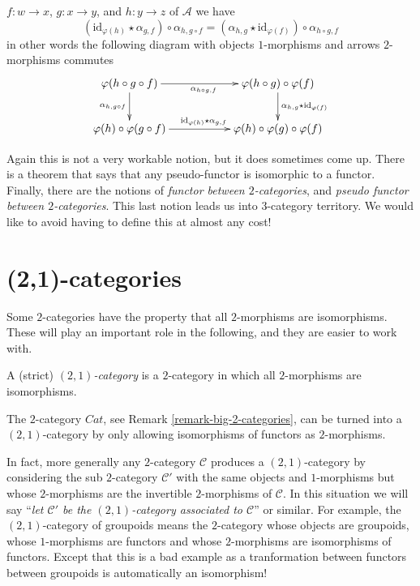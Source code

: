 \begin{definition}
\begin{enumerate}
\begin{enumerate}
$f : w \to x$, $g : x \to y$, and $h : y \to z$ of $\mathcal{A}$
we have
$$
(\text{id}_{\varphi(h)} \star \alpha_{g, f})
\circ
\alpha_{h, g \circ f}
=
(\alpha_{h, g} \star \text{id}_{\varphi(f)})
\circ
\alpha_{h \circ g, f}
$$
in other words the following diagram with objects
$1$-morphisms and arrows $2$-morphisms commutes
$$
\xymatrix{
\varphi(h \circ g \circ f)
\ar[d]_{\alpha_{h, g \circ f}}
\ar[rr]_{\alpha_{h \circ g, f}}
& &
\varphi(h \circ g) \circ \varphi(f)
\ar[d]^{\alpha_{h, g} \star \text{id}_{\varphi(f)}} \\
\varphi(h) \circ \varphi(g \circ f)
\ar[rr]^{\text{id}_{\varphi(h)} \star \alpha_{g, f}}
& &
\varphi(h) \circ \varphi(g) \circ \varphi(f)
}
$$
\end{enumerate}
\end{enumerate}
\end{definition}

\noindent
Again this is not a very workable notion, but it does sometimes come up.
There is a theorem that says that any pseudo-functor is isomorphic to
a functor. Finally, there are the notions of
{\it functor between  $2$-categories}, and
{\it pseudo functor between $2$-categories}.
This last notion leads us into $3$-category territory.
We would like to avoid having to define this at almost any cost!

\section{(2,1)-categories}
\label{section-2-1-categories}

\noindent
Some $2$-categories have
the property that all $2$-morphisms are isomorphisms. These will
play an important role in the following, and they are easier to work with.

\begin{definition}
\label{definition-2-1-category}
A (strict) {\it $(2, 1)$-category} is a $2$-category in which all
$2$-morphisms are isomorphisms.
\end{definition}

\begin{example}
\label{example-2-1-category-of-categories}
The $2$-category $\textit{Cat}$, see Remark \ref{remark-big-2-categories},
can be turned into a $(2, 1)$-category by only allowing isomorphisms of
functors as $2$-morphisms.
\end{example}

\noindent
In fact, more generally any $2$-category
$\mathcal{C}$ produces a $(2, 1)$-category by considering the sub $2$-category
$\mathcal{C}'$ with the same objects and $1$-morphisms but whose
$2$-morphisms are the invertible $2$-morphisms of $\mathcal{C}$.
In this situation we will say ``{\it let $\mathcal{C}'$ be
the $(2, 1)$-category associated to $\mathcal{C}$}'' or similar.
For example, the $(2, 1)$-category of groupoids means the
$2$-category whose objects are groupoids, whose
$1$-morphisms are functors and whose $2$-morphisms are
isomorphisms of functors. Except that this is a bad example as a
tranformation between functors between groupoids is automatically
an isomorphism!

